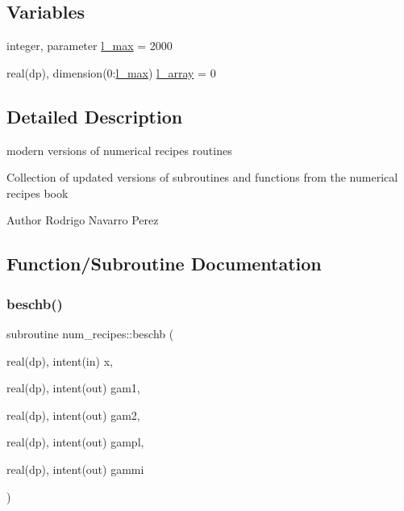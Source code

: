 \subsection*{Variables}
\begin{DoxyCompactItemize}
\item 
integer, parameter \hyperlink{namespacenum__recipes_a5e2fe25448fc2af7b6548e8a6aee6b98}{l\+\_\+max} = 2000
\item 
real(dp), dimension(0\+:\hyperlink{namespacenum__recipes_a5e2fe25448fc2af7b6548e8a6aee6b98}{l\+\_\+max}) \hyperlink{namespacenum__recipes_ac255de146726ccb211ee223424f8be21}{l\+\_\+array} = 0
\end{DoxyCompactItemize}


\subsection{Detailed Description}
modern versions of numerical recipes routines 

Collection of updated versions of subroutines and functions from the numerical recipes book

\begin{DoxyAuthor}{Author}
Rodrigo Navarro Perez 
\end{DoxyAuthor}


\subsection{Function/\+Subroutine Documentation}
\mbox{\label{namespacenum__recipes_a361c889af1a90696af2e7b68b7ea8fd7}} 
\subsubsection{\texorpdfstring{beschb()}{beschb()}}
{\footnotesize\ttfamily subroutine num\+\_\+recipes\+::beschb (\begin{DoxyParamCaption}\item[{real(dp), intent(in)}]{x,  }\item[{real(dp), intent(out)}]{gam1,  }\item[{real(dp), intent(out)}]{gam2,  }\item[{real(dp), intent(out)}]{gampl,  }\item[{real(dp), intent(out)}]{gammi }\end{DoxyParamCaption})\hspace{0.3cm}{\ttfamily [private]}}



